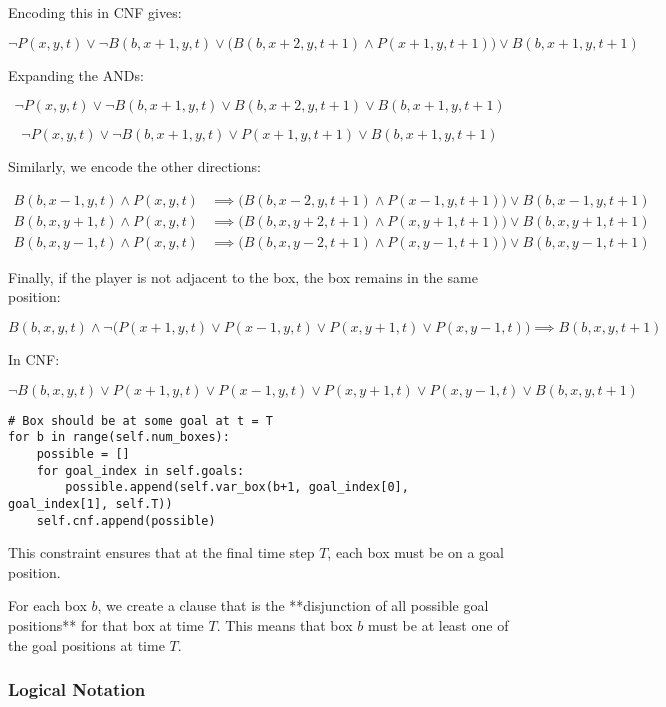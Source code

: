 \documentclass[12pt,a4paper]{article}
\begin{document}
Encoding this in CNF gives:

\[
\neg P(x,y,t) \lor \neg B(b,x+1,y,t) \lor \bigl(B(b,x+2,y,t+1) \wedge P(x+1,y,t+1)\bigr) \vee B(b,x+1,y,t+1)
\]

Expanding the ANDs:

\[
\neg P(x,y,t) \lor \neg B(b,x+1,y,t) \lor B(b,x+2,y,t+1) \vee B(b,x+1,y,t+1)
\]

\[
\neg P(x,y,t) \lor \neg B(b,x+1,y,t) \lor P(x+1,y,t+1) \vee B(b,x+1,y,t+1)
\]

Similarly, we encode the other directions:

\[
\begin{aligned}
B(b,x-1,y,t) \wedge P(x,y,t) &\implies \bigl(B(b,x-2,y,t+1) \wedge P(x-1,y,t+1)\bigr) \vee B(b,x-1,y,t+1) \\
B(b,x,y+1,t) \wedge P(x,y,t) &\implies \bigl(B(b,x,y+2,t+1) \wedge P(x,y+1,t+1)\bigr) \vee B(b,x,y+1,t+1) \\
B(b,x,y-1,t) \wedge P(x,y,t) &\implies \bigl(B(b,x,y-2,t+1) \wedge P(x,y-1,t+1)\bigr) \vee B(b,x,y-1,t+1)
\end{aligned}
\]

Finally, if the player is not adjacent to the box, the box remains in the same position:

\[
B(b,x,y,t) \wedge \neg \bigl(P(x+1,y,t) \vee P(x-1,y,t) \vee P(x,y+1,t) \vee P(x,y-1,t)\bigr) \implies B(b,x,y,t+1)
\]

In CNF:

\[
\neg B(b,x,y,t) \lor P(x+1,y,t) \lor P(x-1,y,t) \lor P(x,y+1,t) \lor P(x,y-1,t) \lor B(b,x,y,t+1)
\]





\begin{lstlisting}
# Box should be at some goal at t = T
for b in range(self.num_boxes):
    possible = []
    for goal_index in self.goals:
        possible.append(self.var_box(b+1, goal_index[0], goal_index[1], self.T))
    self.cnf.append(possible)
\end{lstlisting}

This constraint ensures that at the final time step \(T\), each box must be on a goal position.  

For each box \(b\), we create a clause that is the **disjunction of all possible goal positions** for that box at time \(T\).  
This means that box \(b\) must be at least one of the goal positions at time \(T\).

\subsubsection*{Logical Notation}
\end{document}
